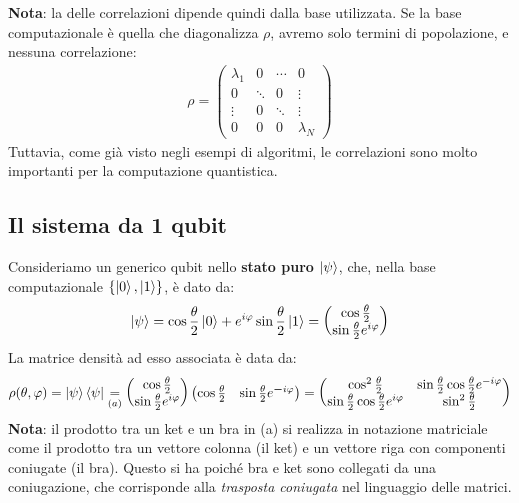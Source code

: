 \documentclass[../../InformazioneQuantistica.tex]{subfiles}
\begin{document}
\textbf{Nota}: la  delle correlazioni dipende quindi dalla base utilizzata. Se la base computazionale è quella che diagonalizza $\rho$, avremo solo termini di popolazione, e nessuna correlazione:
\begin{align*}
\rho = \begin{pmatrix}
\lambda_1 & 0 & \cdots & 0\\
0 & \ddots & 0 & \vdots \\
\vdots & 0  & \ddots &\vdots \\
0 & 0 & 0 & \lambda_N
\end{pmatrix}
\end{align*} 
Tuttavia, come già visto negli esempi di algoritmi, le correlazioni sono molto importanti per la computazione quantistica.

\subsection{Il sistema da 1 qubit}
Consideriamo un generico qubit nello \textbf{stato puro} $\Ket{\psi}$, che, nella base computazionale $\{\Ket{0}, \Ket{1}\}$, è dato da:
\begin{align*}
\Ket{\psi}=\cos\frac{\theta}{2}\Ket{0} + e^{i\varphi}\sin\frac{\theta}{2}\Ket{1} = \begin{pmatrix}
\cos\frac{\theta}{2}\\
\sin\frac{\theta}{2}e^{i\varphi}
\end{pmatrix}
\end{align*}
La matrice densità ad esso associata è data da:
\begin{align}
\rho(\theta,\varphi) = \Ket{\psi}\Bra{\psi}\underset{(a)}{=} \begin{pmatrix}
\cos\frac{\theta}{2}\\
\sin\frac{\theta}{2}e^{i\varphi}
\end{pmatrix}
\begin{pmatrix}
\cos\frac{\theta}{2} & \sin\frac{\theta}{2}e^{\bm{-}i\varphi}
\end{pmatrix} = \begin{pmatrix}
\cos^2 \frac{\theta}{2} & \sin\frac{\theta}{2}\cos\frac{\theta}{2} e^{-i\varphi}\\
\sin\frac{\theta}{2}\cos\frac{\theta}{2} e^{i\varphi} & \sin^2 \frac{\theta}{2}
\end{pmatrix}
\label{eqn:rho-qubit}
\end{align}
\textbf{Nota}: il prodotto tra un ket e un bra in (a) si realizza in notazione matriciale come il prodotto tra un vettore colonna (il ket) e un vettore riga con componenti coniugate (il bra). Questo si ha poiché bra e ket sono collegati da una coniugazione, che corrisponde alla \textit{trasposta coniugata} nel linguaggio delle matrici.\\
\end{document}
